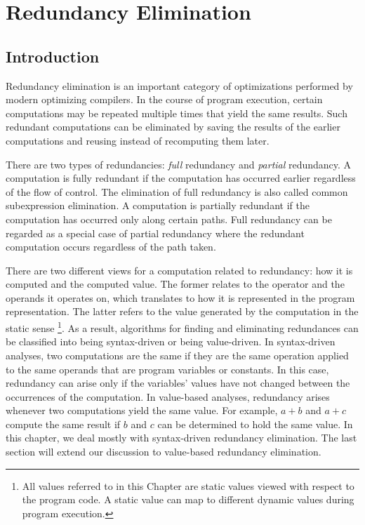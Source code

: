 \chapter{Redundancy Elimination }
\graphicspath{{img/}{pre_not_helped/img/}{part3/pre_not_helped/img/}}

\section{Introduction}
\label{section:Part3:Pre_not_helped:Intro}

Redundancy elimination is an 
important category of optimizations performed by modern optimizing compilers.
In the course of program execution, certain computations may be repeated
multiple times that yield the same results.  Such redundant
computations can be eliminated by saving the results of the earlier
computations and reusing instead of recomputing them later.

There are two types of redundancies: \emph{full} redundancy and 
\emph{partial} redundancy.  A computation is fully redundant if the 
computation has occurred earlier regardless of the flow of control.
The elimination of full redundancy is also called common subexpression
elimination.  A computation is partially redundant if the 
computation has occurred only along certain paths.  Full redundancy can be
regarded as a special case of partial redundancy where the redundant computation
occurs regardless of the path taken.

There are two different views for a computation related to redundancy: how it 
is computed and the computed value.  The former relates to the operator
and the operands it operates on, which translates to how it is 
represented in the program representation.  The latter refers to the value
generated by the computation in the static sense
\footnote{All values referred to in this Chapter are static values viewed
with respect to the program code.  A static value can map to different
dynamic values during program execution.}.  As a result, algorithms for
finding and eliminating redundances can be classified into being syntax-driven
or being value-driven.  In syntax-driven analyses,
two computations are the same if they are the same operation applied to the
same operands that are program variables or constants.
In this case, redundancy can arise only if the 
variables' values have not changed between the occurrences of the computation.
In value-based analyses, redundancy arises whenever two computations yield the
same value.  For example, $a+b$ and $a+c$ compute the same result
if $b$ and $c$ can be determined to hold the same value.
In this chapter, we deal mostly with syntax-driven redundancy elimination.
The last section will extend our discussion to value-based redundancy
elimination.

